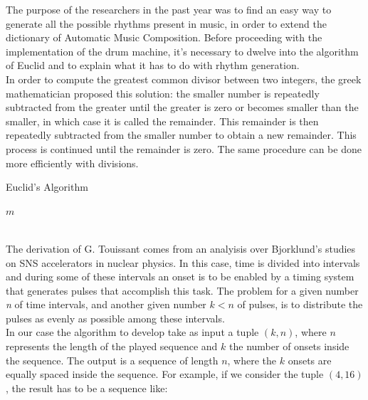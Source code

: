 \documentclass[main.tex]{subfiles}
\begin{document}
The purpose of the researchers in the past year was to find an easy way to generate all the possible rhythms present in music, in order to extend the dictionary of Automatic Music Composition\cite{Allouche:2002:AutomSeq:book}.
Before proceeding with the implementation of the drum machine, it’s necessary to dwelve into the algorithm of Euclid and to explain what it has to do with rhythm generation.\\
In order to compute the greatest common divisor between two integers, the greek mathematician proposed this solution: the smaller number is repeatedly subtracted from the greater until the greater is zero or becomes smaller than the smaller, in which case it is called the remainder. This remainder is then repeatedly subtracted from the smaller number to obtain a new remainder. This process is continued until the remainder is zero\cite{Euclid:Elements}. 
The same procedure can be done more efficiently with divisions.\\
[2mm]
\begin{algorithm}
\caption{Euclid's Algorithm}\label{euclid}
\begin{algorithmic}[1]
\State \Return $m$
\Else
\State {}

\EndIf
\EndProcedure
\end{algorithmic}
\end{algorithm}\\
[3mm]
The derivation of G. Touissant\cite{Toussaint:2004:euclidean:rhythm} comes from an analyisis over Bjorklund's studies on SNS accelerators\cite{Bjorklund:2003:euclidean:rhythm} in nuclear physics. In this case, time is divided into intervals and during some of these intervals an onset is to be enabled by a timing system that generates pulses that accomplish this task. The problem for a given number \textit{n} of time intervals, and another given number \begin{math}k<n\end{math} of pulses, is to distribute the pulses as evenly as possible among these intervals.\\
In our case the algorithm to develop take as input a tuple \begin{math}{(k, n)}\end{math}, where \begin{math}{n}\end{math} represents the length of the played sequence and \begin{math}{k}\end{math} the number of onsets inside the sequence. The output is a sequence of length \begin{math}{n}\end{math}, where the \begin{math}{k}\end{math} onsets are equally spaced inside the sequence. For example, if we consider the tuple \begin{math}{(4, 16)}\end{math}, the result has to be a sequence like:\\
\end{document}
